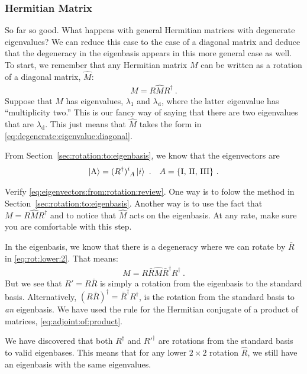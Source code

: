 \documentclass[12pt]{article}
\begin{document}
\subsubsection*{Hermitian Matrix}

So far so good. What happens with general Hermitian matrices with degenerate eigenvalues? We can reduce this case to the case of a diagonal matrix and deduce that the degeneracy in the eigenbasis appears in this more general case as well. To start, we remember that any Hermitian matrix $M$ can be written as a rotation of a diagonal matrix, $\hat M$: 
\begin{align}
    M = R \hat M R^\dag \ .
\end{align}
Suppose that $M$ has eigenvalues, $\lambda_1$ and $\lambda_\text{d}$, where the latter eigenvalue has ``multiplicity two.'' This is our fancy way of saying that there are two eigenvalues that are $\lambda_\text{d}$. This just means that $\hat M$ takes the form in \eqref{eq:degenerate:eigenvalue:diagonal}. 

From Section~\ref{sec:rotation:to:eigenbasis}, we know that the eigenvectors are 
\begin{align}
    \ket{\text{A}} &= (R^\dag)\aij{i}{A}\ket{i} \ .
    &
    A = \{\text{I, II, III}\} \ .
    \label{eq:eigenvectors:from:rotation:review}
\end{align}
\begin{exercise}
Verify \eqref{eq:eigenvectors:from:rotation:review}. One way is to folow the method in Section~\ref{sec:rotation:to:eigenbasis}. Another way is to use the fact that $M = R\hat{M}R^\dag$ and to notice that $\hat M$ acts on the eigenbasis. At any rate, make sure you are comfortable with this step. 
\end{exercise}
In the eigenbasis, we know that there is a degeneracy where we can rotate by $\bar R$ in \eqref{eq:rot:lower:2}. That means:
\begin{align}
    M = R \bar R\hat M \bar R^\dag R^\dag \ .
\end{align}
But we see that $R'= R\bar{R}$ is simply a rotation from the eigenbasis to the standard basis. Alternatively, $(R\bar R)^\dag = \bar R^\dag R^\dag$, is the rotation from the standard basis to \emph{an} eigenbasis. We have used the rule for the Hermitian conjugate of a product of matrices, \eqref{eq:adjoint:of:product}. 

We have discovered that both $R^\dag$ and $R'^\dag$ are rotations from the standard basis to valid eigenbases. This means that for any lower $2\times 2$ rotation $\hat R$, we still have an eigenbasis with the same eigenvalues. 
\end{document}
